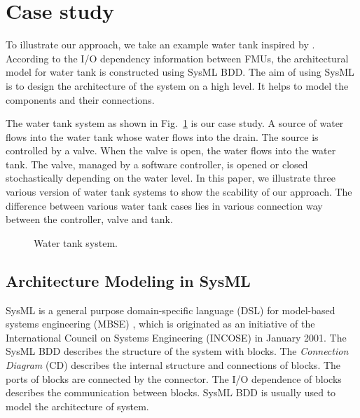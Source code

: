 
\section{Case study}
\label{sec:sysml}
To illustrate our approach, we take an example water tank inspired by \cite{AmalioPCW16}. According to the I/O dependency information between FMUs, the architectural model for water tank is constructed using SysML BDD. The aim of using SysML is to design the architecture of the system on a high level. It helps to model the components and their connections.

The water tank system as shown in Fig.~\ref{tankfig} is our case study. A source of water flows into the water tank whose water flows into the drain. The source is controlled by a valve. When the valve is open, the water flows into the water tank. The valve, managed by a software controller, is opened or closed stochastically depending on the water level. In this paper, we illustrate three various version of water tank systems to show the scability of our approach. The difference between various water tank cases lies in various connection way between the controller, valve and tank. 
\begin{figure}[htbp]
	\caption{Water tank system.}
	\label{tankfig}
\end{figure} 
\subsection{Architecture Modeling in SysML}
SysML is a general purpose domain-specific language (DSL) \cite{SemerathBHSV17} for model-based systems engineering (MBSE) \cite{Dori16}, which is originated as an initiative of the International Council on Systems Engineering (INCOSE) \cite{Pepper2015International} in January 2001. The SysML BDD describes the structure of the system with blocks. The \textit{Connection Diagram} (CD) describes the internal structure and connections of blocks. The ports of blocks are connected by the connector. The I/O dependence of blocks describes the communication between blocks. SysML BDD is usually used to model the architecture of system.


